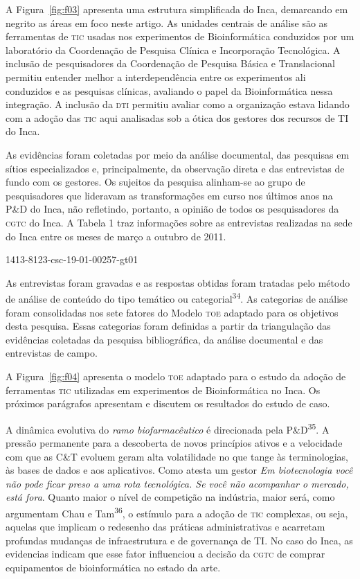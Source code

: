 \documentclass{article}
\begin{document}
A Figura~\ref{fig:f03}
apresenta uma estrutura simplificada do Inca, demarcando em negrito as áreas em
foco neste artigo. As unidades centrais de análise são as ferramentas de \textsc{tic}
usadas nos experimentos de Bioinformática conduzidos por um laboratório da
Coordenação de Pesquisa Clínica e Incorporação Tecnológica. A inclusão de
pesquisadores da Coordenação de Pesquisa Básica e Translacional permitiu
entender melhor a interdependência entre os experimentos ali conduzidos e as
pesquisas clínicas, avaliando o papel da Bioinformática nessa integração. A
inclusão da \textsc{dti} permitiu avaliar como a organização estava lidando com a adoção
das \textsc{tic} aqui analisadas sob a ótica dos gestores dos recursos de TI do Inca.

As evidências foram coletadas por meio da análise documental, das pesquisas em
sítios especializados e, principalmente, da observação direta e das entrevistas
de fundo com os gestores. Os sujeitos da pesquisa alinham-se ao grupo de
pesquisadores que lideravam as transformações em curso nos últimos anos na P\&D
do Inca, não refletindo, portanto, a opinião de todos os pesquisadores da \textsc{cgtc}
do Inca. A Tabela 1 traz informações sobre as entrevistas realizadas na sede do
Inca entre os meses de março a outubro de 2011.

1413-8123-csc-19-01-00257-gt01

As entrevistas foram gravadas e as respostas obtidas foram tratadas pelo método
de análise de conteúdo do tipo temático ou categorial\textsuperscript{34}. As categorias de análise foram consolidadas nos sete fatores do Modelo \textsc{toe}
adaptado para os objetivos desta pesquisa. Essas categorias foram definidas a
partir da triangulação das evidências coletadas da pesquisa bibliográfica, da
análise documental e das entrevistas de campo.

A Figura~\ref{fig:f04}
apresenta o modelo \textsc{toe} adaptado para o estudo da adoção de ferramentas \textsc{tic}
utilizadas em experimentos de Bioinformática no Inca. Os próximos parágrafos
apresentam e discutem os resultados do estudo de caso.

A dinâmica evolutiva do \textit{ramo biofarmacêutico}
é direcionada pela P\&D\textsuperscript{35}. A pressão permanente para a descoberta de novos princípios ativos e a
velocidade com que as C\&T evoluem geram alta volatilidade no que tange às
terminologias, às bases de dados e aos aplicativos. Como atesta um gestor
\textit{Em biotecnologia você não pode ficar preso a uma rota tecnológica. Se
você não acompanhar o mercado, está fora}. Quanto maior o nível de competição na indústria, maior será, como argumentam
Chau e Tam\textsuperscript{36}, o estímulo para a adoção de \textsc{tic} complexas, ou seja, aquelas que implicam o
redesenho das práticas administrativas e acarretam profundas mudanças de
infraestrutura e de governança de TI. No caso do Inca, as evidencias indicam que
esse fator influenciou a decisão da \textsc{cgtc} de comprar equipamentos de
bioinformática no estado da arte.
\end{document}
